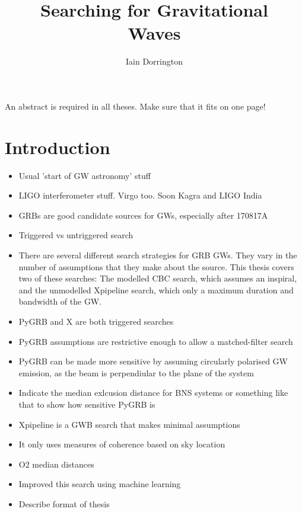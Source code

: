 \documentclass[12pt,twoside,a4paper]{report}
\begin{document}
\title{Searching for Gravitational \\
         Waves}
\author{Iain Dorrington}


\beforepreface

An abstract is required in all theses.  Make sure that it fits
on one page!

\afterpreface



\chapter{Introduction}
\begin{itemize}
\item Usual 'start of GW astronomy' stuff
\item LIGO interferometer stuff. Virgo too. Soon Kagra and LIGO India
\item GRBs are good candidate sources for GWs, especially after 170817A
\item Triggered vs untriggered search
\item There are several different search strategies for GRB GWs. They vary in the number of assumptions that they make about the source. This thesis covers two of these searches: The modelled CBC search, which assumes an inspiral, and the unmodelled Xpipeline search, which only a maximum duration and bandwidth of the GW.
\item PyGRB and X are both triggered searches
\item PyGRB assumptions are restrictive enough to allow a matched-filter search 
\item PyGRB can be made more sensitive by assuming circularly polarised GW emission, as the beam is perpendiular to the plane of the system
\item Indicate the median exlcusion distance for BNS systems or something like that to show how sensitive PyGRB is
\item Xpipeline is a GWB search that makes minimal assumptions
\item It only uses measures of coherence based on sky location
\item O2 median distances
\item Improved this search using machine learning
\item Describe format of thesis
\end{itemize}
\end{document}
